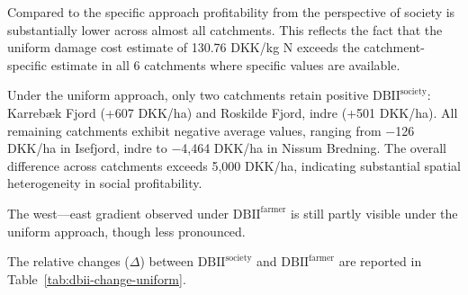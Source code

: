 \documentclass[12pt]{article}
\begin{document}
Compared to the specific approach profitability from the perspective of society is substantially lower across almost all catchments. 
This reflects the fact that the uniform damage cost estimate of 130.76 DKK/kg N exceeds the catchment-specific estimate in all 6 catchments where specific values are available.

Under the uniform approach, only two catchments retain positive $\mathrm{DBII^{society}}$: Karrebæk Fjord (+607 DKK/ha) and Roskilde Fjord, indre (+501 DKK/ha). 
All remaining catchments exhibit negative average values, ranging from $-$126 DKK/ha in Isefjord, indre to $-$4,464 DKK/ha in Nissum Bredning. 
The overall difference across catchments exceeds 5,000 DKK/ha, indicating substantial spatial heterogeneity in social profitability.

The west–--east gradient observed under $\mathrm{DBII^{farmer}}$ is still partly visible under the uniform approach, though less pronounced. 

The relative changes ($\Delta$) between $\mathrm{DBII^{society}}$ and $\mathrm{DBII^{farmer}}$ are reported in Table~\ref{tab:dbii-change-uniform}. 
\end{document}
